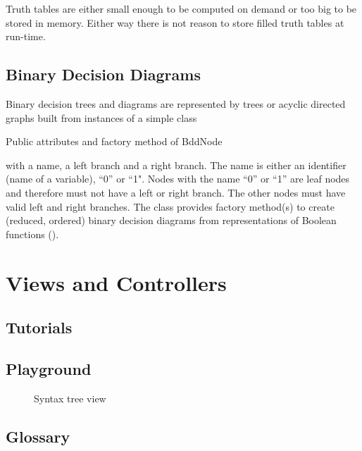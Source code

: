 Truth tables are either small enough to be computed on demand or too big to be stored in memory.
Either way there is not reason to store filled truth tables at run-time.

\subsection{Binary Decision Diagrams}

Binary decision trees and diagrams are represented by trees or acyclic directed graphs built from instances of a simple class
\begin{table}[htdp]
\begin{center}
\caption{Public attributes and factory method of BddNode}
\label{fig:BddNode}
\end{center}
\end{table}
 with a name, a left branch and a right branch. The name is either an identifier (name of a variable), “0” or “1". 
Nodes with the name “0” or “1” are leaf nodes and therefore must not have a left or right branch.
The other nodes must have valid left and right branches. The class provides factory method(s) to create 
(reduced, ordered) binary decision diagrams from representations of Boolean functions
().




\section{Views and Controllers}

\subsection{Tutorials}

\subsection{Playground}

\begin{figure}[htbp]
\begin{center}
\caption{Syntax tree view}
\label{fig:TreeView}
\end{center}
\end{figure}



\subsection{Glossary}

